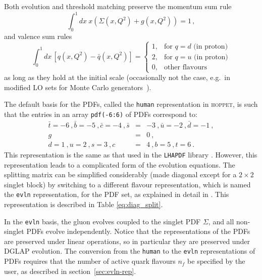 \documentclass[12pt]{article}
\newcommand{\bea}{\begin{eqnarray}}
\newcommand{\eea}{\end{eqnarray}}
\newcommand{\lp}{\left(}
\newcommand{\rp}{\right)}
\newcommand{\nn}{\nonumber}
\newcommand{\eg}{e.g.\ }
\newcommand{\hoppet}{\textsc{hoppet}\xspace}
\newcommand{\ttt}[1]{\texttt{#1}}
\begin{document}
Both evolution and threshold matching preserve the momentum sum rule
\begin{equation}
  \int_0^1 dx~x \lp \Sigma(x,Q^2)+g(x,Q^2)\rp =1 \,,
\end{equation}
and valence sum rules
\begin{equation}
  \int_0^1 dx\, \left[q(x,Q^2)-{\bar q}(x,Q^2) \right] = \left\{ 
    \begin{array}{ll}
      1, & \text{for } q = d \text{ (in proton)}\\
      2, & \text{for } q = u \text{ (in proton)}\\
      0, & \text{other flavours}
    \end{array}
    \right.
\end{equation}
as long as they hold at the initial scale (occasionally not the case,
\eg in modified LO sets for Monte Carlo
generators~\cite{Sherstnev:2008dm}).

The default basis for the PDFs, called the \ttt{human} 
representation in \hoppet, is such that 
 the entries in an array
\ttt{pdf(-6:6)} of PDFs correspond to:
\bea 
\bar t={-6} \ ,  \bar b={-5} \ ,  \bar c={-4}
\ , \nn   \bar s&=&{-3} \ , \nn  \bar u={-2} \ , \nn
 \bar d={-1} \ , \\  g&=&{0} \ , \\ \nn   d={1} \ , \nn  u={2} 
\ , \nn  
s={3} \ , \nn   c&=&{4} \ , \nn b={5} \ , \nn  t={6} \ . \nn 
\eea
 This representation is the
same as that used in the \ttt{LHAPDF} library \cite{LHAPDF}. 
However, this representation leads
to a complicated form of the evolution equations.
The splitting matrix can be simplified considerably (made diagonal
except for a $2\times2$ singlet block) by switching to a different
flavour representation, which is named
the \ttt{evln} representation, for the PDF set, as explained in detail in
\cite{vanNeerven:1999ca,vanNeerven:2000uj}. This representation
is described in Table \ref{eq:diag_split}.

In the {\tt evln} basis, 
the gluon evolves coupled to the singlet  PDF $\Sigma$,
and all non-singlet PDFs evolve independently.
Notice that the representations of the PDFs
are preserved under linear operations, so in particular
they are preserved under DGLAP evolution.
The conversion from the \ttt{human} to the \ttt{evln}
representations of PDFs requires that the number of
active quark flavours $n_f$ be specified by the user, as described in
section~\ref{sec:evln-rep}.
\end{document}

